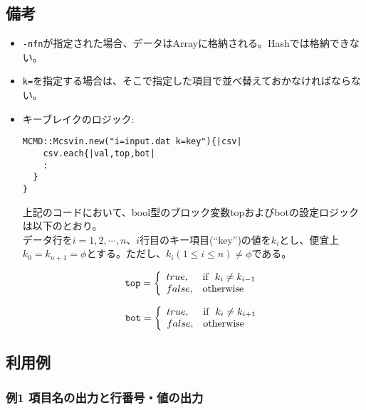 \subsection{備考}
\begin{itemize}
\item \verb|-nfn|が指定された場合、データはArrayに格納される。Hashでは格納できない。
\item \verb|k=|を指定する場合は、そこで指定した項目で並べ替えておかなければならない。
\item キーブレイクのロジック:
\begin{verbatim}
MCMD::Mcsvin.new("i=input.dat k=key"){|csv|
	csv.each{|val,top,bot|
    :
  }
}
\end{verbatim}
上記のコードにおいて、bool型のブロック変数topおよびbotの設定ロジックは以下のとおり。\\
データ行を$i=1,2,\cdots,n$、$i$行目のキー項目(``key'')の値を$k_i$とし、便宜上$k_0=k_{n+1}=\phi$とする。ただし、$k_i(1\le i \le n) \ne \phi$である。

\begin{eqnarray}
\verb/top/=\left\{
\begin{array}{ll}
true,  & {\rm if}\hspace{2mm} k_i \ne k_{i-1} \\
false, & {\rm otherwise}\\
\end{array} \right.
\label{eq:retDisc}
\end{eqnarray}

\begin{eqnarray}
\verb/bot/=\left\{
\begin{array}{ll}
true,  & {\rm if}\hspace{2mm} k_i \ne k_{i+1} \\
false, & {\rm otherwise}\\
\end{array} \right.
\label{eq:retDisc}
\end{eqnarray}

\end{itemize}

\subsection{利用例}
\subsubsection*{例1 項目名の出力と行番号・値の出力}

